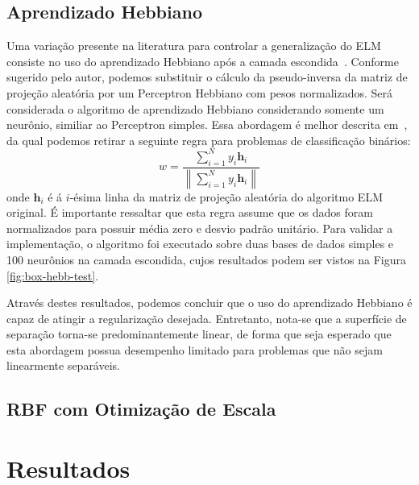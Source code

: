 \documentclass[conference]{IEEEtran}
\begin{document}
	\subsection{Aprendizado Hebbiano}
	Uma variação presente na literatura para controlar a generalização do ELM consiste no uso do aprendizado Hebbiano após a camada escondida~\cite{horta2015aplicaccao}. Conforme sugerido pelo autor, podemos substituir o cálculo da pseudo-inversa da matriz de projeção aleatória por um Perceptron Hebbiano com pesos normalizados. Será considerada o algoritmo de aprendizado Hebbiano considerando somente um neurônio, similiar ao Perceptron simples. Essa abordagem é melhor descrita em~\cite{fernandez2011direct}, da qual podemos retirar a seguinte regra para problemas de classificação binários:
	\begin{equation}
		w = \frac{ \sum^{N}_{i=1} y_i\textbf{h}_i}{\left\|  \sum^{N}_{i=1} y_i\textbf{h}_i \right\| }
	\end{equation}
	onde $\textbf{h}_i$ é á $i$-ésima linha da matriz de projeção aleatória do algoritmo ELM original. É importante ressaltar que esta regra assume que os dados foram normalizados para possuir média zero e desvio padrão unitário. Para validar a implementação, o algoritmo foi executado sobre duas bases de dados simples e 100 neurônios na camada escondida, cujos resultados podem ser vistos na Figura \ref{fig:box-hebb-test}.
	
	
	Através destes resultados, podemos concluir que o uso do aprendizado Hebbiano é capaz de atingir a regularização desejada. Entretanto, nota-se que a superfície de separação torna-se predominantemente linear, de forma que seja esperado que esta abordagem possua desempenho limitado para problemas que não sejam linearmente separáveis.
	
	
	\subsection{RBF com Otimização de Escala}
	
	\section{Resultados}
	
\end{document}
